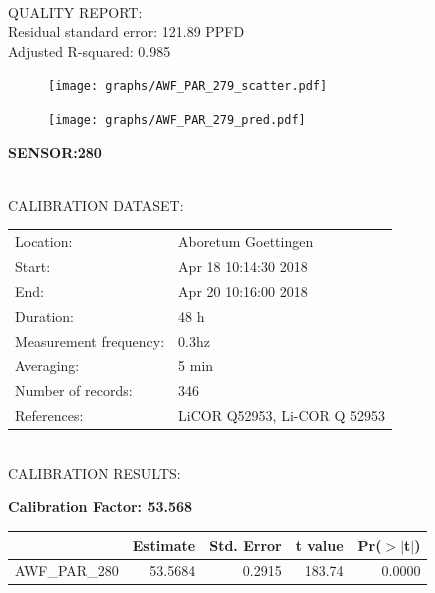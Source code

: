 \documentclass[oneside]{report}
\begin{document}
\hrulefill\\
QUALITY REPORT:\\
Residual standard error: 121.89 PPFD\\
Adjusted R-squared: 0.985



\begin{figure}[H]
  \centering
  \texttt{[image: graphs/AWF\_PAR\_279\_scatter.pdf]}
\end{figure}




\begin{figure}[H]
  \centering
  \texttt{[image: graphs/AWF\_PAR\_279\_pred.pdf]}
\end{figure}

\pagebreak


\begin{center}
\large{\textbf{SENSOR:280}}\\
\end{center}

\hrulefill\\
CALIBRATION DATASET:\\
\begin{table}[h!]
  \centering
  \label{tab:table1}
  \begin{tabular}{ll}
    Location: & Aboretum Goettingen\\ 
    
    
    Start:  & Apr 18 10:14:30 2018 \\
    End:   & Apr 20 10:16:00 2018\\ 
    Duration: & 48 h\\
    Measurement frequency: & 0.3hz\\
    Averaging:  &5 min\\
    Number of records: & 346 \\
    References: & LiCOR Q52953, Li-COR Q 52953 \\
  \end{tabular}
\end{table}

\hrulefill\\
CALIBRATION RESULTS:\\


\begin{center}
\textbf{\large{Calibration Factor: 53.568}}\\
\end{center}
\begin{table}[ht]
\centering
\begin{tabular}{rrrrr}
  \hline
 & Estimate & Std. Error & t value & Pr($>$$|$t$|$) \\ 
  \hline
AWF\_PAR\_280 & 53.5684 & 0.2915 & 183.74 & 0.0000 \\ 
   \hline
\end{tabular}
\end{table}
\end{document}
